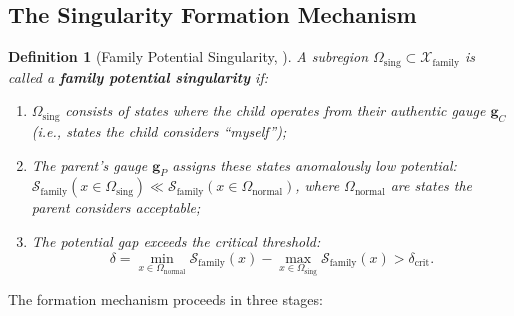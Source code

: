 \documentclass[11pt,a4paper]{article}
\newtheorem{definition}[theorem]{Definition}
\newcommand{\cS}{\mathcal{S}}
\begin{document}
\subsection{The Singularity Formation Mechanism}

\begin{definition}[Family Potential Singularity, \textbf{}]
\label{def:family_singularity}
A subregion $\Omega_{\text{sing}} \subset \mathcal{X}_{\text{family}}$ is called a \textbf{family potential singularity} if:
\begin{enumerate}[label=(\roman*)]
    \item $\Omega_{\text{sing}}$ consists of states where the child operates from their authentic gauge $\mathbf{g}_C$ (i.e., states the child considers ``myself'');
    \item The parent's gauge $\mathbf{g}_P$ assigns these states anomalously low potential: $\cS_{\text{family}}(x \in \Omega_{\text{sing}}) \ll \cS_{\text{family}}(x \in \Omega_{\text{normal}})$, where $\Omega_{\text{normal}}$ are states the parent considers acceptable;
    \item The potential gap exceeds the critical threshold:
    \begin{equation}
        \delta = \min_{x \in \Omega_{\text{normal}}} \cS_{\text{family}}(x) - \max_{x \in \Omega_{\text{sing}}} \cS_{\text{family}}(x) > \delta_{\text{crit}}.
    \end{equation}
\end{enumerate}
\end{definition}

The formation mechanism proceeds in three stages:
\end{document}
